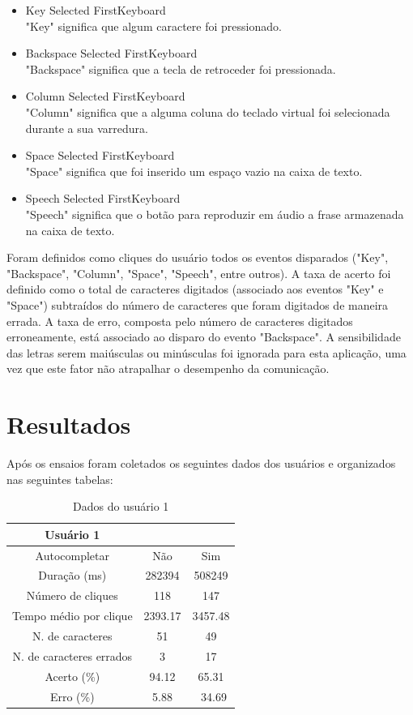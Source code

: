\documentclass[twoside]{article}
\begin{document}
\begin{multicols}{2}
\begin{itemize}
\item Key Selected FirstKeyboard
\hfill \\
  "Key" significa que algum caractere foi pressionado.
\item Backspace Selected FirstKeyboard
\hfill \\
  "Backspace" significa que a tecla de retroceder foi pressionada.
\item Column Selected FirstKeyboard
\hfill \\
  "Column" significa que a alguma coluna do teclado virtual foi selecionada durante a sua varredura.
\item Space Selected FirstKeyboard
\hfill \\
  "Space" significa que foi inserido um espaço vazio na caixa de texto.
\item Speech Selected FirstKeyboard
\hfill \\
  "Speech" significa que o botão para reproduzir em áudio a frase armazenada na caixa de texto.
\end{itemize}

\noindent Foram definidos como cliques do usuário todos os eventos disparados ("Key", "Backspace", "Column", "Space", "Speech", entre outros). A taxa de acerto foi definido como o total de caracteres digitados (associado aos eventos "Key" e "Space") subtraídos do número de caracteres que foram digitados de maneira errada. A taxa de erro, composta pelo número de caracteres digitados erroneamente, está associado ao disparo do evento "Backspace".
A sensibilidade das letras serem maiúsculas ou minúsculas foi ignorada para esta aplicação, uma vez que este fator não atrapalhar o desempenho da comunicação.

\section{Resultados}

Após os ensaios foram coletados os seguintes dados dos usuários e organizados nas seguintes tabelas:

\begin{table}[H]
\caption{Dados do usuário 1}
\centering
\begin{tabular}{ccc}
\toprule
 Usuário 1 &  & \\
\midrule
Autocompletar & Não & Sim\\
Duração (ms) & 282394 & 508249\\
Número de cliques & 118 & 147\\
Tempo médio por clique & 2393.17 & 3457.48\\
N. de caracteres & 51 & 49\\
N. de caracteres errados & 3 & 17\\
Acerto (\%) & 94.12 & 65.31\\
Erro (\%) & 5.88 &\ 34.69\\
\bottomrule
\end{tabular}
\end{table}



\end{multicols}
\end{document}
